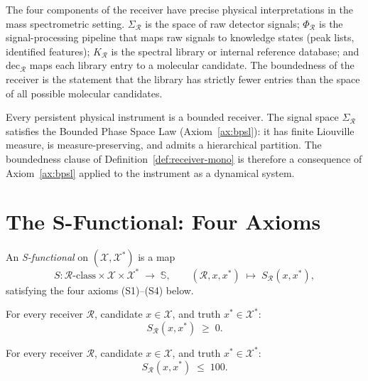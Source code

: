 The four components of the receiver have precise physical interpretations in
the mass spectrometric setting.  $\Sigma_{\mathcal{R}}$ is the space of raw
detector signals; $\Phi_{\mathcal{R}}$ is the signal-processing pipeline that
maps raw signals to knowledge states (peak lists, identified features);
$K_{\mathcal{R}}$ is the spectral library or internal reference database; and
$\mathrm{dec}_{\mathcal{R}}$ maps each library entry to a molecular candidate.
The boundedness of the receiver is the statement that the library has strictly
fewer entries than the space of all possible molecular candidates.

\begin{remark}
Every persistent physical instrument is a bounded receiver.  The signal space
$\Sigma_{\mathcal{R}}$ satisfies the Bounded Phase Space Law
(Axiom~\ref{ax:bpsl}): it has finite Liouville measure, is measure-preserving,
and admits a hierarchical partition.  The boundedness clause of
Definition~\ref{def:receiver-mono} is therefore a consequence of
Axiom~\ref{ax:bpsl} applied to the instrument as a dynamical system.
\end{remark}

\section{The S-Functional: Four Axioms}
\label{sec:ch13-functional}

\begin{definition}[S-functional]\label{def:sfunc-mono}
An \emph{S-functional} on $(\mathcal{X}, \mathcal{X}^{*})$ is a map
\[
  S : \mathcal{R}\text{-class} \times \mathcal{X} \times \mathcal{X}^{*}
    \;\longrightarrow\; \mathbb{S},
  \qquad
  (\mathcal{R}, x, x^{*}) \;\mapsto\; S_{\mathcal{R}}(x, x^{*}),
\]
satisfying the four axioms (S1)--(S4) below.
\end{definition}

\begin{theorem}\label{ax:S1-mono}
For every receiver $\mathcal{R}$, candidate $x \in \mathcal{X}$, and truth
$x^{*} \in \mathcal{X}^{*}$:
\[
  S_{\mathcal{R}}(x, x^{*}) \;\geq\; 0.
\]
\end{theorem}

\begin{theorem}[(S2) Boundedness]\label{ax:S2-mono}
For every receiver $\mathcal{R}$, candidate $x \in \mathcal{X}$, and truth
$x^{*} \in \mathcal{X}^{*}$:
\[
  S_{\mathcal{R}}(x, x^{*}) \;\leq\; 100.
\]
\end{theorem}

